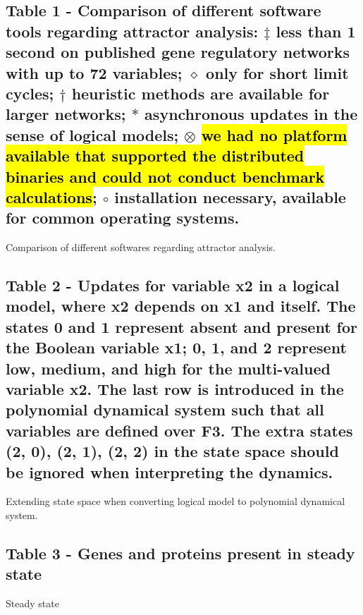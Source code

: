 \documentclass[10pt]{bmc_article}
\newenvironment{bmcformat}{\begin{raggedright}\baselineskip20pt\sloppy\setboolean{publ}{false}}{\end{raggedright}\baselineskip20pt\sloppy}
\begin{document}
\begin{bmcformat}
\subsection*{Table 1 -
	Comparison of different software tools regarding attractor analysis:
	$\ddagger$ less than 1 second
  		on published gene regulatory networks with up to 72 variables; 
	$\diamond$
  		only for short limit cycles;
	$ \dagger$ heuristic methods are available for larger networks; 
	$*$ asynchronous updates in the sense of logical models;
	$\otimes$ \hl{we had no platform available that supported the distributed binaries and could not conduct benchmark calculations};
		$\circ$ installation necessary, available for common operating systems.}
		Comparison of different softwares regarding attractor analysis.

\subsection*{Table 2 - 
	Updates for variable x2 in a logical model, where x2 depends on x1 and itself. The states 0 and 1 represent absent and present for the Boolean variable x1; 0, 1, and 2 represent low, medium, and high for the multi-valued variable x2. The last row is introduced in the polynomial dynamical system such that all variables are defined over F3. The extra states (2, 0), (2, 1), (2, 2) in the state space should be ignored when interpreting the dynamics.}
	Extending state space when converting logical model to polynomial dynamical system.
	
\subsection*{Table 3 -
 	Genes and proteins present in steady state}
	Steady state


\end{bmcformat}
\end{document}
